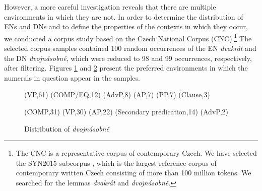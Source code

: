\documentclass[output=paper,modfonts,hidelinks,newtxmath
\ChapterDOI{10.5281/zenodo.2545513}
]{langscibook}
\begin{document}
\noindent However, a more careful investigation reveals that there are multiple environments in which they are not. In order to determine the distribution of ENs and DNs and to define the properties of the contexts in which they occur, we conducted a corpus study based on the Czech National Corpus (CNC).\footnote{The CNC is a representative corpus of contemporary Czech. We have selected the SYN2015 subcorpus \citep{kren-etal2015}, which is the largest reference corpus of contemporary written Czech consisting of more than 100 million tokens. We searched for the lemmas \textit{dvakrát} and \textit{dvojnásobně}.} The selected corpus samples contained 100 random occurrences of the EN \textit{dvakrát} and the DN \textit{dvojnásobně}, which were reduced to 98 and 99 occurrences, respectively, after filtering. Figures \ref{fig:distr_dvakrat} and \ref{fig:distr_dvojnasobne} present the preferred environments in which the numerals in question appear in the samples.

\begin{figure}[t]
\label{fig:distr_dvakrat}

\footnotesize
{}%
{
(VP,61)
(COMP/EQ,12)
(AdvP,8)
(AP,7)
(PP,7)
(Clause,3)
}
\end{figure}

\normalsize
\begin{figure}
\caption{Distribution of \textit{dvojnásobně}}
\footnotesize
\label{fig:distr_dvojnasobne}
%
{
(COMP,31)
(VP,30)
(AP,22)
(Secondary predication,14)
(AdvP,2)
}
\end{figure}
\normalsize

\end{document}
